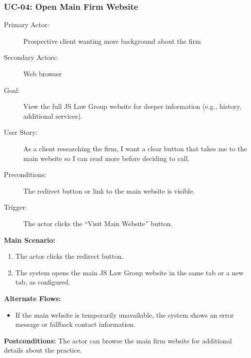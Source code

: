 \documentclass{article}
\begin{document}
\subsubsection{UC-04: Open Main Firm Website}
\begin{description}
  \item[Primary Actor:] Prospective client wanting more background about the firm
  \item[Secondary Actors:] Web browser
  \item[Goal:] View the full JS Law Group website for deeper information (e.g., history, additional services).
  \item[User Story:] As a client researching the firm, I want a clear button that takes me to the main website so I can read more before deciding to call.
  \item[Preconditions:] The redirect button or link to the main website is visible.
  \item[Trigger:] The actor clicks the ``Visit Main Website'' button.
\end{description}
\textbf{Main Scenario:}
\begin{enumerate}
  \item The actor clicks the redirect button.
  \item The system opens the main JS Law Group website in the same tab or a new tab, as configured.
\end{enumerate}
\textbf{Alternate Flows:}
\begin{itemize}
  \item If the main website is temporarily unavailable, the system shows an error message or fallback contact information.
\end{itemize}
\textbf{Postconditions:} The actor can browse the main firm website for additional details about the practice.
\end{document}
